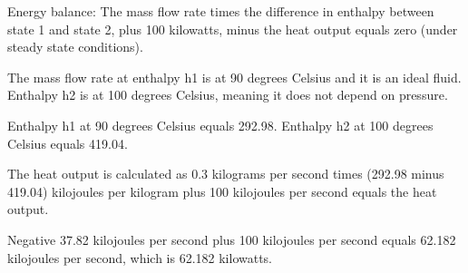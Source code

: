 Energy balance:
The mass flow rate times the difference in enthalpy between state 1 and state 2, plus 100 kilowatts, minus the heat output equals zero (under steady state conditions).

The mass flow rate at enthalpy h1 is at 90 degrees Celsius and it is an ideal fluid.
Enthalpy h2 is at 100 degrees Celsius, meaning it does not depend on pressure.

Enthalpy h1 at 90 degrees Celsius equals 292.98.
Enthalpy h2 at 100 degrees Celsius equals 419.04.

The heat output is calculated as 0.3 kilograms per second times (292.98 minus 419.04) kilojoules per kilogram plus 100 kilojoules per second equals the heat output.

Negative 37.82 kilojoules per second plus 100 kilojoules per second equals 62.182 kilojoules per second, which is 62.182 kilowatts.